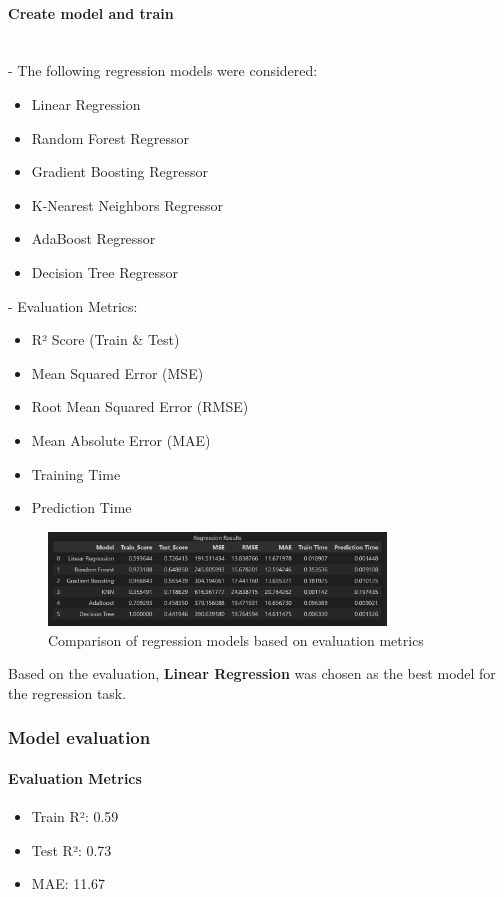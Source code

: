 \documentclass[12pt,a4paper]{report}
\begin{document}
\paragraph{Create model and train}~\\
\noindent - The following regression models were considered:
\begin{itemize}
    \item Linear Regression
    \item Random Forest Regressor
    \item Gradient Boosting Regressor
    \item K-Nearest Neighbors Regressor
    \item AdaBoost Regressor
    \item Decision Tree Regressor
\end{itemize}

- Evaluation Metrics:
\begin{itemize}
    \item R² Score (Train \& Test)
    \item Mean Squared Error (MSE)
    \item Root Mean Squared Error (RMSE)
    \item Mean Absolute Error (MAE)
    \item Training Time
    \item Prediction Time
\end{itemize}

\begin{figure}[H]
    \centering
    \includegraphics[width=0.8\textwidth]{media/image15.png}
    \caption{Comparison of regression models based on evaluation metrics}
    \label{fig:regression-comparison}
\end{figure}

Based on the evaluation, \textbf{Linear Regression} was chosen as the best model for the regression task.

\subsubsection{Model evaluation}
\paragraph{Evaluation Metrics}
\begin{itemize}
    \item Train R²: 0.59
    \item Test R²: 0.73
    \item MAE: 11.67
\end{itemize}
\end{document}
